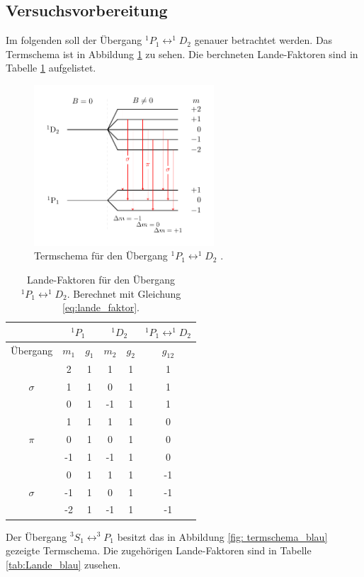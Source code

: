 \subsection{Versuchsvorbereitung}

Im folgenden soll der Übergang  $^1P_1\leftrightarrow ^1\!\!D_2$ genauer betrachtet werden.
Das Termschema ist in Abbildung \ref{fig: termschema_rot} zu sehen. Die berchneten Lande-Faktoren %
sind in Tabelle \ref{tab:Lande_rot} aufgelistet.

\FloatBarrier
\begin{figure}[h]
  \centering
  \includegraphics[width=0.6\textwidth]{pics/termschema_rot.pdf}
  \caption{Termschema für den Übergang $^1P_1\leftrightarrow ^1\!\!D_2$ \cite{luckyjosh}.}
  \label{fig: termschema_rot}
\end{figure}
\FloatBarrier
\FloatBarrier
\begin{table}
	\centering
  \caption{Lande-Faktoren für den Übergang $^1P_1\leftrightarrow ^1\!\!D_2$.  Berechnet mit Gleichung \eqref{eq:lande_faktor}.}
	\label{tab:Lande_rot}
	\begin{tabular}{cccccc}
		\toprule
		{} & \multicolumn{2}{c}{${}^1P_1$}  & \multicolumn{2}{c}{${}^1D_2$}  & $^1P_1\leftrightarrow ^1\!\!D_2$ \\
		\midrule
		 Übergang &   $m_1$  & $g_{1}$ & $m_2$ & $ g_2$  & $g_{12}$  \\
		\midrule
		& 2 & 1 & 1 & 1 & 1\\
		$\sigma$& 1 & 1 & 0 & 1 & 1\\
		& 0 & 1 & -1 & 1 & 1\\
		\midrule
		& 1 & 1 & 1 & 1 & 0\\
		$\pi$ & 0 & 1 & 0 & 1 & 0\\
		& -1 & 1 & -1 & 1 & 0\\
		\midrule
		& 0 & 1 & 1 & 1 & -1\\
		$\sigma$ & -1 & 1 & 0 & 1 & -1\\
		& -2 & 1 & -1 & 1 & -1\\\bottomrule
	\end{tabular}

\end{table}
\FloatBarrier
Der Übergang $^3S_1\leftrightarrow ^3\!\!P_1$ besitzt das in Abbildung \ref{fig: termschema_blau} gezeigte
Termschema. Die zugehörigen Lande-Faktoren sind in Tabelle \ref{tab:Lande_blau} zusehen. %



